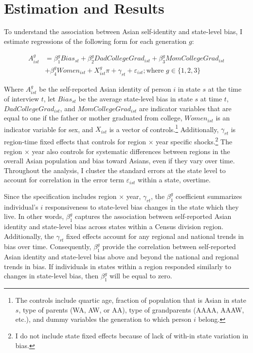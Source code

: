 \section{Estimation and Results}\label{sec:empstrat}

To understand the association between Asian self-identity and state-level bias, I estimate regressions of the following form for each generation $g$:
 
\begin{align}
A_{ist}^g &= \beta_1^g Bias_{st} + \beta_2^g DadCollegeGrad_{ist} + \beta_3^g MomCollegeGrad_{ist} \nonumber \\ 
            &+ \beta_4^g Women_{ist} + X_{ist}^g\pi + \gamma_{rt} 
           + \varepsilon_{ist}; 
           \text{where } g \in \{1,2,3\} \label{eq:identity_reg_bias}
\end{align}

Where $A_{ist}^g$ be the self-reported Asian identity of person $i$ in state $s$ at the time of interview $t$, let $Bias_{st}$ be the average state-level bias in state $s$ at time $t$, $DadCollegeGrad_{ist}$, and $MomCollegeGrad_{ist}$ are indicator variables that are equal to one if the father or mother graduated from college, $Women_{ist}$ is an indicator variable for sex, and $X_{ist}$ is a vector of controls.\footnote{The controls include quartic age, fraction of population that is Asian in state $s$, type of parents (WA, AW, or AA), type of grandparents (AAAA, AAAW, etc.), and dummy variables the generation to which person $i$ belong.} Additionally, $\gamma_{rt}$ is region-time fixed effects that controls for region $\times$ year specific shocks.\footnote{I do not include state fixed effects because of lack of with-in state variation in bias.} The region $\times$ year also controls for systematic differences between regions in the overall Asian population and bias toward Asians, even if they vary over time. Throughout the analysis, I cluster the standard errors at the state level to account for correlation in the error term $\varepsilon_{ist}$ within a state, overtime.

Since the specification includes region $\times$ year, $\gamma_{rt}$, the $\beta_1^g$ coefficient summarizes individual's $i$ responsiveness to state-level bias changes in the state which they live. In other words, $\beta_1^g$ captures the association between self-reported Asian identity and state-level bias across states within a Census division region. Additionally, the $\gamma_{rt}$ fixed effects account for any regional and national trends in bias over time. Consequently, $\beta_1^g$ provide the correlation between self-reported Asian identity and state-level bias above and beyond the national and regional trends in bias. If individuals in states within a region responded similarly to changes in state-level bias, then $\beta_1^g$ will be equal to zero. 

